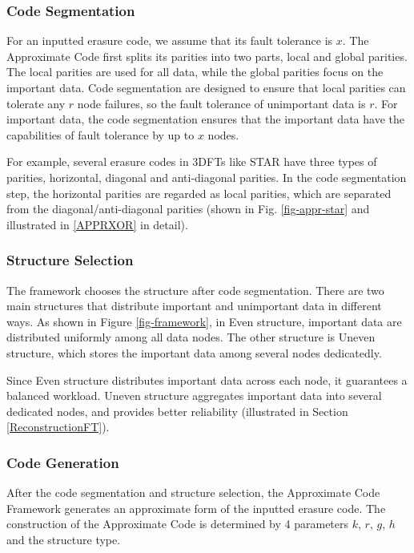 \documentclass[sigconf]{acmart}
\begin{document}
\subsubsection{Code Segmentation}
For an inputted erasure code, we assume that its fault tolerance is $x$. The Approximate Code first splits its parities into two parts, local and global parities. The local parities are used for all data, while the global parities focus on the important data. Code segmentation are designed to ensure that local parities can tolerate any $r$ node failures, so the fault tolerance of unimportant data is $r$. For important data, the code segmentation ensures that the important data have the capabilities of fault tolerance by up to $x$ nodes.

For example, several erasure codes in 3DFTs like STAR have three types of parities, horizontal, diagonal and anti-diagonal parities. In the code segmentation step, the horizontal parities are regarded as local parities, which are separated from the diagonal/anti-diagonal parities (shown in Fig. \ref{fig-appr-star} and illustrated in \ref{APPRXOR} in detail).

\subsubsection{Structure Selection}
The framework chooses the structure after code segmentation.
There are two main structures that distribute important and unimportant data in different ways.
As shown in Figure \ref{fig-framework}, in Even structure, important data are distributed uniformly among all data nodes. The other structure is Uneven structure, which stores the important data among several nodes dedicatedly.

Since Even structure distributes important data across each node, it guarantees a balanced workload. Uneven structure aggregates important data into several dedicated nodes, and provides better reliability (illustrated in Section \ref{ReconstructionFT}).

\subsubsection{Code Generation}\label{code-gen}
After the code segmentation and structure selection, the Approximate Code Framework generates an approximate form of the inputted erasure code.
The construction of the Approximate Code is determined by 4 parameters $k$, $r$, $g$, $h$ and the structure type.
\end{document}
